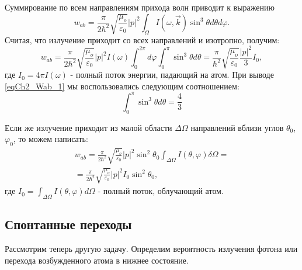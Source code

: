 Суммирование по всем направлениям прихода волн приводит к выражению
\begin{equation}
w_{ab} = \frac{\pi}{2 \hbar^2}\sqrt{\frac{\mu_o}{\varepsilon_0}}
\left|p\right|^2
\int_{\Omega}I\left(\omega, \vec{k}\right)
\sin^3 \theta d \theta d \varphi.
\end{equation}
Считая, что излучение приходит со всех направлений и изотропно, 
получим: 
\begin{equation}
w_{ab} = \frac{\pi}{2 \hbar^2}\sqrt{\frac{\mu_o}{\varepsilon_0}}
\left|p\right|^2 I\left(\omega\right)
\int_{0}^{2 \pi}d \varphi \int_0^{\pi}
\sin^3 \theta d \theta = 
\frac{\pi}{ \hbar^2}\sqrt{\frac{\mu_o}{\varepsilon_0}}
\frac{\left|p\right|^2}{3}I_0,
\label{eqCh2_Wab_1}
\end{equation}
где $I_0 = 4 \pi I\left(\omega\right)$ - полный поток энергии,
падающий на атом. При выводе  \eqref{eqCh2_Wab_1}
мы воспользовались следующим соотношением:
\[
 \int_0^{\pi}
\sin^3 \theta d \theta = \frac{4}{3}
\]

Если же излучение приходит из малой области
$\Delta \Omega$ направлений вблизи углов $\theta_0$, $\varphi_0$, то 
можем написать:  
\begin{eqnarray}
w_{ab} = \frac{\pi}{2 \hbar^2}\sqrt{\frac{\mu_o}{\varepsilon_0}}
\left|p\right|^2 \sin^2 \theta_0
\int_{\Delta \Omega} I\left(\theta, \varphi\right)
\delta \Omega = 
\nonumber \\
= 
\frac{\pi}{2 \hbar^2}\sqrt{\frac{\mu_o}{\varepsilon_0}}
\left|p\right|^2  I_0 \sin^2 \theta_0,
\label{eqCh2_Wab_2}
\end{eqnarray}
где $I_0 = \int_{\Delta \Omega} I\left(\theta, \varphi\right)
d \Omega$ -  полный поток, облучающий атом.

\subsection{Спонтанные переходы}
Рассмотрим теперь другую задачу. Определим вероятность излучения
фотона или перехода возбужденного атома в нижнее состояние.  

